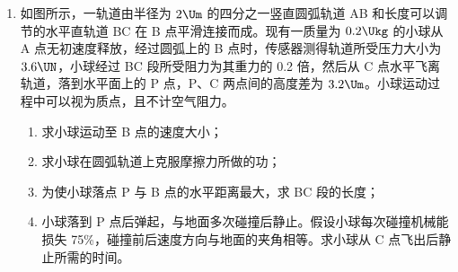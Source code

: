 \documentclass[\gkver]{gaokaozhenti}
\begin{document}
\begin{enumerate}
{	（3）由运动学公式得，企鹅上滑位移为 $x_{1}=\frac{(at)^{2}}{2a_{1}}=1\Um$，退滑到出发点的速度满足 $v^{2}=2a_{2}(x+x_{1})$，联立解得 $v=2\sqrt{34}\Ums\approx11.7\Ums$。
}

\item
如图所示，一轨道由半径为 $2\Um$ 的四分之一竖直圆弧轨道 AB 和长度可以调节的水平直轨道 BC 在 B 点平滑连接而成。现有一质量为 $0.2\Ukg$ 的小球从 A 点无初速度释放，经过圆弧上的 B 点时，传感器测得轨道所受压力大小为 $3.6\UN$，小球经过 BC 段所受阻力为其重力的 0.2 倍，然后从 C 点水平飞离轨道，落到水平面上的 P 点，P、C 两点间的高度差为 $3.2\Um$。小球运动过程中可以视为质点，且不计空气阻力。
\begin{enumerate}
	\item
	求小球运动至 B 点的速度大小；
	\item
	求小球在圆弧轨道上克服摩擦力所做的功；
	\item
	为使小球落点 P 与 B 点的水平距离最大，求 BC 段的长度；
	\item
	小球落到 P 点后弹起，与地面多次碰撞后静止。假设小球每次碰撞机械能损失 75\%，碰撞前后速度方向与地面的夹角相等。求小球从 C 点飞出后静止所需的时间。
\end{enumerate}
\end{enumerate}
\end{document}
